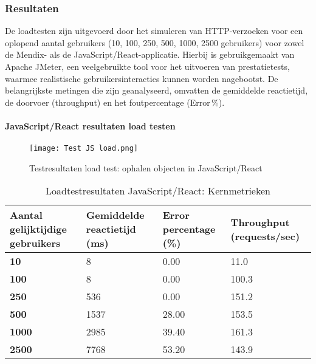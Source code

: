 \subsubsection{Resultaten}
De loadtesten zijn uitgevoerd door het simuleren van HTTP-verzoeken voor een oplopend aantal gebruikers (10, 100, 250, 500, 1000, 2500 gebruikers) voor zowel de Mendix- als de JavaScript/React-applicatie. Hierbij is gebruikgemaakt van Apache JMeter, een veelgebruikte tool voor het uitvoeren van prestatietests, waarmee realistische gebruikersinteracties kunnen worden nagebootst. De belangrijkste metingen die zijn geanalyseerd, omvatten de gemiddelde reactietijd, de doorvoer (throughput) en het foutpercentage (Error \%).

\paragraph{JavaScript/React resultaten load testen}

\begin{figure}[H]
    \centering
    \texttt{[image: Test JS load.png]}
    \caption[\centering Testresultaten load test: ophalen objecten in JavaScript/React]{\label{fig:loadtest-JavaScript} Testresultaten load test: ophalen objecten in JavaScript/React}
\end{figure}


\begin{table}[h]
    \centering
    \begin{tabular}{ |p{5cm}|p{3cm}|p{3cm}|p{3cm}|}
        \hline
        \textbf{Aantal gelijktijdige \newline gebruikers} & \textbf{Gemiddelde reactietijd (ms)} & \textbf{Error \newline percentage (\%)} & \textbf{Throughput (requests/sec)}\\
        \hline
        \textbf{10}  & 8 & 0.00 & 11.0 \\
        \hline
        \textbf{100} & 8 & 0.00 & 100.3 \\
        \hline
        \textbf{250}  & 536 & 0.00 & 151.2 \\
        \hline
        \textbf{500}  & 1537 & 28.00 & 153.5 \\
        \hline                       
        \textbf{1000}  & 2985 & 39.40 & 161.3  \\
        \hline
        \textbf{2500}  & 7768 & 53.20 & 143.9 \\
        \hline
    \end{tabular}
    \caption[\centering Loadtestresultaten JavaScript/React: Kernmetrieken]{\label{tab:Testresultaten JS loadtest}Loadtestresultaten JavaScript/React: Kernmetrieken}
\end{table}


